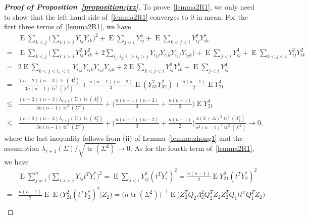 \documentclass[3p]{elsarticle}
\DeclareMathOperator{\mytr}{tr}
\DeclareMathOperator{\myE}{E}
\theoremstyle{plain}
\theoremstyle{definition}
\theoremstyle{remark}
\begin{document}
\begin{proof}[\textbf{Proof of Proposition~\ref{proposition:jxz}}]
To prove~\eqref{lemma2R1}, we only need to show that the left hand side of~\eqref{lemma2R1} converges to $0$ in mean.
    For the first three terms of~\eqref{lemma2R1}, we have
    \begin{equation*}
    \begin{aligned}
        &\myE\sum_{k<j}\big(\sum_{i:i>j} Y_{ij} Y_{ik}\big)^2
        +\myE\sum_{j<i}Y_{ij}^4
        +\myE\sum_{k<j<i}Y_{ij}^2 Y_{ik}^2
        \\
        =&
        \myE\sum_{k<j}\Big(\sum_{i:i>j} Y_{ij}^2 Y_{ik}^2
        +2\sum_{i_1,i_2:i_1>i_2>j} Y_{i_1 j} Y_{i_1 k} Y_{i_2 j} Y_{i_2 k}\Big)
        +\myE\sum_{j<i}Y_{ij}^4
        +\myE\sum_{k<j<i}Y_{ij}^2 Y_{ik}^2
        \\
        =&
        2\myE\sum_{k<j<i_2<i_1}Y_{i_1 j} Y_{i_1 k} Y_{i_2 j} Y_{i_2 k}
        +2\myE\sum_{k<j<i}Y_{ij}^2 Y_{ik}^2
        +\myE\sum_{j<i}Y_{ij}^4
        \\
        =&
        \frac{(n-2)(n-3) \mytr(\Lambda_2^4)}{3n(n-1)\mytr^2(\Sigma^2)}
        +\frac{n(n-1)(n-2)}{3}\myE (Y_{31}^2 Y_{32}^2)
        +\frac{n(n-1)}{2}\myE Y_{21}^4
        \\
        \leq &
        \frac{(n-2)(n-3) \lambda_{r+1}(\Sigma)\mytr(\Lambda_2^2)}{3n(n-1)\mytr^2(\Sigma^2)}
        +\Big(\frac{n(n-1)(n-2)}{3} +\frac{n(n-1)}{2}\Big)\myE Y_{21}^4
        \\
        \leq &
        \frac{(n-2)(n-3) \lambda_{r+1}(\Sigma)\mytr(\Lambda_2^2)}{3n(n-1)\mytr^2(\Sigma^2)}
        +\Big(\frac{n(n-1)(n-2)}{3} +\frac{n(n-1)}{2}\Big)
\frac{4(3+\Delta)^2\mytr^2(\Lambda_2^2)}{n^2(n-1)^2\mytr^2(\Sigma^2)}
        \to  0,
    \end{aligned}
    \end{equation*}
    where the last inequality follows from (ii) of Lemma~\ref{lemma:zhong1} and the assumption $\lambda_{r+1}(\Sigma)/\sqrt{\mytr (\Sigma^2)}\to 0$.
    As for the fourth term of~\eqref{lemma2R1}, we have
$$
\begin{aligned}
    &\myE\sum_{j=1}^n \big(\sum_{i:i>j} Y_{ij} t^T Y_i^*\big)^2
=
    \myE\sum_{j<i} Y_{ij}^2 (t^T Y_i^{*})^2
    =
    \frac{n(n-1)}{2} \myE Y_{21}^2 (t^T Y_2^{*})^2
    \\
    =&
    \frac{n(n-1)}{2}  
    \myE \myE\big(Y_{21}^2 (t^T Y_2^{*})^2\big| Z_2\big)
    =\big(n\mytr(\Sigma^2)\big)^{-1} \myE \big( Z_2^T Q_2 \Lambda_2^2 Q_2^T Z_2 Z_2^T Q_1 t t^T Q_1^T Z_2\big) \\

\end{aligned}$$
\end{proof}
\end{document}
